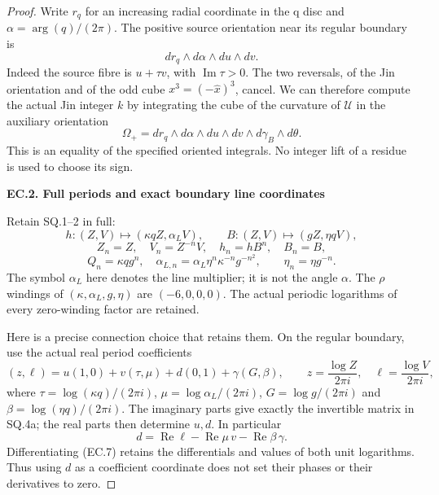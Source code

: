 \begin{proof}
Write \(r_q\) for an increasing radial coordinate in the q disc and
\(\alpha=\arg(q)/(2\pi)\). The positive source orientation near its
regular boundary is
\[
 dr_q\wedge d\alpha\wedge du\wedge dv .
                                                        \tag{EC.3}
\]
Indeed the source fibre is \(u+\tau v\), with
\(\operatorname{Im}\tau>0\). The two reversals, of the Jin
orientation and of the odd cube \(x^3=(-\widehat x)^3\), cancel.
We can therefore compute the actual Jin integer \(k\) by integrating
the cube of the curvature of \(\mathcal U\) in the auxiliary
orientation
\[
 \Omega_+=dr_q\wedge d\alpha\wedge du\wedge dv
                         \wedge d\gamma_B\wedge d\theta .
                                                        \tag{EC.4}
\]
This is an equality of the specified oriented integrals. No integer
lift of a residue is used to choose its sign.

\par

\medskip\noindent\textbf{EC.2. Full periods and exact boundary line coordinates}

\par\nobreak

Retain SQ.1--2 in full:
\[
 h:(Z,V)\mapsto(\kappa qZ,\alpha_L V),\qquad
 B:(Z,V)\mapsto(gZ,\eta qV),
\]
\[
 Z_n=Z,\quad V_n=Z^{-n}V,\quad h_n=hB^n,\quad B_n=B,
\]
\[
 Q_n=\kappa qg^n,\quad
 \alpha_{L,n}=\alpha_L\eta^n\kappa^{-n}g^{-n^2},
 \qquad\eta_n=\eta g^{-n}.
                                                        \tag{EC.5}
\]
The symbol \(\alpha_L\) here denotes the line multiplier; it is
not the angle \(\alpha\). The \(\rho\) windings of
\((\kappa,\alpha_L,g,\eta)\) are \((-6,0,0,0)\).
The actual periodic logarithms of every zero-winding factor are
retained.

Here is a precise connection choice that retains them. On the regular
boundary, use the actual real period coefficients
\[
 (z,\ell)=u(1,0)+v(\tau,\mu)+d(0,1)+\gamma(G,\beta),
 \qquad z=\frac{\log Z}{2\pi i},\quad
        \ell=\frac{\log V}{2\pi i},
                                                        \tag{EC.6}
\]
where
\(\tau=\log(\kappa q)/(2\pi i)\),
\(\mu=\log\alpha_L/(2\pi i)\),
\(G=\log g/(2\pi i)\) and
\(\beta=\log(\eta q)/(2\pi i)\).
The imaginary parts give exactly the invertible matrix in SQ.4a;
the real parts then determine \(u,d\). In particular
\[
 d=\operatorname{Re}\ell-\operatorname{Re}\mu\,v
                           -\operatorname{Re}\beta\,\gamma.
                                                        \tag{EC.7}
\]
Differentiating (EC.7) retains the differentials and values of both
unit logarithms. Thus using \(d\) as a coefficient coordinate does
not set their phases or their derivatives to zero.


\end{proof}
